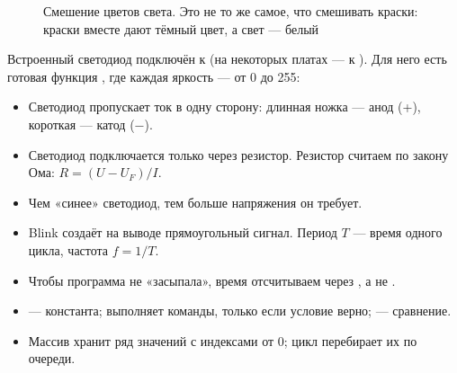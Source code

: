 \begin{figure}[H]
\centering
{}
\caption{Смешение цветов света. Это не то же самое, что смешивать краски: краски вместе дают тёмный цвет, а свет --- белый}
\end{figure}

Встроенный светодиод подключён к  (на некоторых платах --- к ). Для него есть готовая
функция , где каждая яркость --- от 0 до 255:


\begin{summary}
\begin{itemize}[leftmargin=*]
  \item Светодиод пропускает ток в одну сторону: длинная ножка --- анод (+), короткая --- катод (−).
  \item Светодиод подключается только через резистор. Резистор считаем по закону Ома: $R = (U - U_F)/I$.
  \item Чем «синее» светодиод, тем больше напряжения он требует.
  \item Blink создаёт на выводе прямоугольный сигнал. Период $T$ --- время одного цикла, частота $f = 1/T$.
  \item Чтобы программа не «засыпала», время отсчитываем через , а не .
  \item {} --- константа;  выполняет команды, только если условие верно; \code{==} --- сравнение.
  \item Массив хранит ряд значений с индексами от 0; цикл  перебирает их по очереди.
\end{itemize}
\end{summary}

